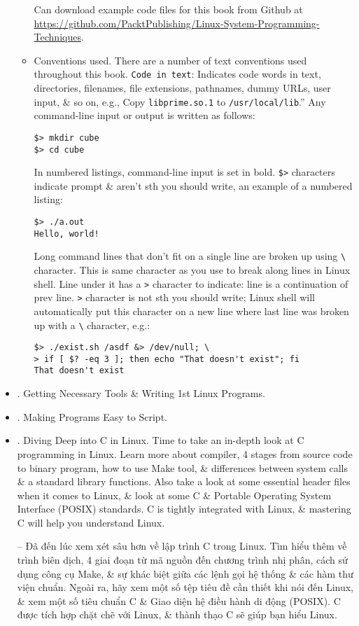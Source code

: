 \documentclass{article}
\begin{document}
\begin{itemize}
\begin{itemize}
        Can download example code files for this book from Github at \url{https://github.com/PacktPublishing/Linux-System-Programming-Techniques}.
        \item {\sf Conventions used.} There are a number of text conventions used throughout this book. {\tt Code in text}: Indicates code words in text, directories, filenames, file extensions, pathnames, dummy URLs, user input, \& so on, e.g., Copy {\tt libprime.so.1} to {\tt/usr/local/lib}.'' Any command-line input or output is written as follows:
        \begin{verbatim}
$> mkdir cube
$> cd cube
        \end{verbatim}
        In numbered listings, command-line input is set in bold. \verb|$>| characters indicate prompt \& aren't sth you should write, an example of a numbered listing:
        \begin{verbatim}
$> ./a.out
Hello, world!
        \end{verbatim}
        Long command lines that don't fit on a single line are broken up using \verb|\| character. This is same character as you use to break along lines in Linux shell. Line under it has a {\tt>} character to indicate: line is a continuation of prev line. {\tt>} character is not sth you should write; Linux shell will automatically put this character on a new line where last line was broken up with a \verb|\| character, e.g.:
        \begin{verbatim}
$> ./exist.sh /asdf &> /dev/null; \
> if [ $? -eq 3 ]; then echo "That doesn't exist"; fi
That doesn't exist
        \end{verbatim}
    \end{itemize}
    \item {. Getting Necessary Tools \& Writing 1st Linux Programs.}
    \item {\sf2. Making Programs Easy to Script.}
    \item {. Diving Deep into C in Linux.} Time to take an in-depth look at C programming in Linux. Learn more about compiler, 4 stages from source code to binary program, how to use Make tool, \& differences between system calls \& a standard library functions. Also take a look at some essential header files when it comes to Linux, \& look at some C \& Portable Operating System Interface (POSIX) standards. C is tightly integrated with Linux, \& mastering C will help you understand Linux.
    
    -- Đã đến lúc xem xét sâu hơn về lập trình C trong Linux. Tìm hiểu thêm về trình biên dịch, 4 giai đoạn từ mã nguồn đến chương trình nhị phân, cách sử dụng công cụ Make, \& sự khác biệt giữa các lệnh gọi hệ thống \& các hàm thư viện chuẩn. Ngoài ra, hãy xem một số tệp tiêu đề cần thiết khi nói đến Linux, \& xem một số tiêu chuẩn C \& Giao diện hệ điều hành di động (POSIX). C được tích hợp chặt chẽ với Linux, \& thành thạo C sẽ giúp bạn hiểu Linux.
    

\end{itemize}
\end{document}
